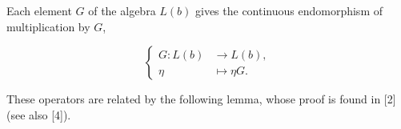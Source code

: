 Each element $G$ of the algebra $L(b)$ gives the continuous endomorphism
of multiplication by $G$,

\begin{equation}\tag{4.5.7}
\left\{
\begin{aligned}
G:L(b)&\longrightarrow L(b),\\
\eta&\longmapsto\eta G.
\end{aligned}
\right.
\end{equation}

These operators are related by the following lemma, whose proof is found in
[2] (see also [4]).
